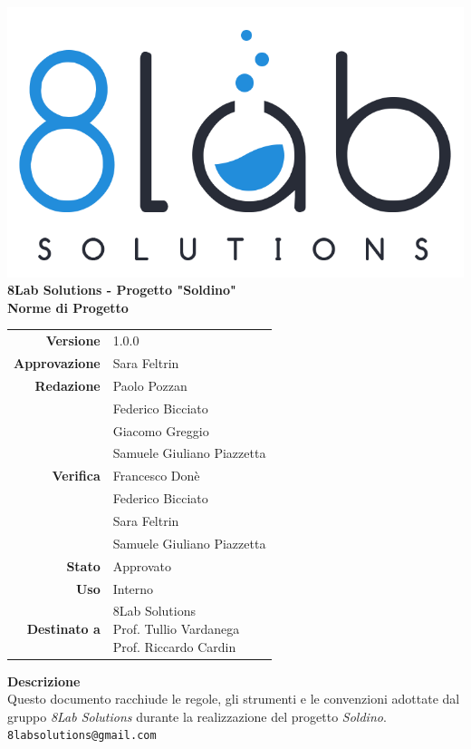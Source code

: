 \thispagestyle{empty}
\begin{titlepage}
	\begin{center}
		\includegraphics[scale = 0.3]{res/images/logo8_crop.png}\\
		\large \textbf{8Lab Solutions - Progetto "Soldino"} \\
		\vfill
		\Huge \textbf{Norme di Progetto}
		\vspace*{\fill} 
        \vfill
        \large
        \begin{tabular}{r|l}
                        \textbf{Versione} & 1.0.0\\
                        \textbf{Approvazione} & Sara Feltrin\\
                        \textbf{Redazione} & Paolo Pozzan\\&
                        	Federico Bicciato\\&
                        	Giacomo Greggio\\&
                        	Samuele Giuliano Piazzetta\\
                        \textbf{Verifica} & Francesco Donè\\&
                        	Federico Bicciato\\&
                        	Sara Feltrin\\&
                        	Samuele Giuliano Piazzetta\\
                        \textbf{Stato} & Approvato\\
                        \textbf{Uso} & Interno\\
                        \textbf{Destinato a} & \parbox[t]{5cm}{8Lab Solutions\\Prof. Tullio Vardanega\\Prof. Riccardo Cardin}
                \end{tabular}
                \vfill
                \normalsize
                \textbf{Descrizione}\\
                Questo documento racchiude le regole, gli strumenti e le convenzioni adottate dal gruppo \textit{8Lab Solutions} durante la realizzazione del progetto \textit{Soldino}.\\
                \vfill
                \small
                \texttt{8labsolutions@gmail.com}
	\end{center}
\end{titlepage}